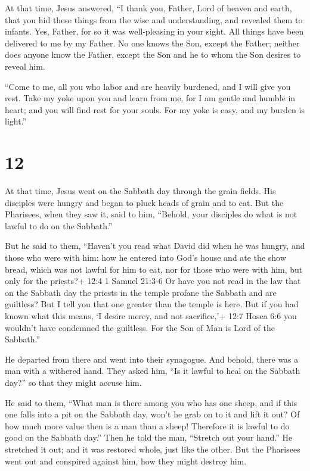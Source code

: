  At that time, Jesus answered, ``I thank you, Father, Lord
of heaven and earth, that you hid these things from the wise and
understanding, and revealed them to infants.  Yes, Father,
for so it was well-pleasing in your sight.  All things have
been delivered to me by my Father. No one knows the Son, except the
Father; neither does anyone know the Father, except the Son and he to
whom the Son desires to reveal him.

 ``Come to me, all you who labor and are heavily burdened,
and I will give you rest.  Take my yoke upon you and learn
from me, for I am gentle and humble in heart; and you will find rest for
your souls.  For my yoke is easy, and my burden is light.''

\hypertarget{section-11}{%
\section{12}\label{section-11}}

 At that time, Jesus went on the Sabbath day through the
grain fields. His disciples were hungry and began to pluck heads of
grain and to eat.  But the Pharisees, when they saw it, said
to him, ``Behold, your disciples do what is not lawful to do on the
Sabbath.''

 But he said to them, ``Haven't you read what David did when
he was hungry, and those who were with him:  how he entered
into God's house and ate the show bread, which was not lawful for him to
eat, nor for those who were with him, but only for the priests?+ 12:4 1
Samuel 21:3-6  Or have you not read in the law that on the
Sabbath day the priests in the temple profane the Sabbath and are
guiltless?  But I tell you that one greater than the temple
is here.  But if you had known what this means, `I desire
mercy, and not sacrifice,'+ 12:7 Hosea 6:6 you wouldn't have condemned
the guiltless.  For the Son of Man is Lord of the Sabbath.''

 He departed from there and went into their synagogue.
 And behold, there was a man with a withered hand. They
asked him, ``Is it lawful to heal on the Sabbath day?'' so that they
might accuse him.

 He said to them, ``What man is there among you who has one
sheep, and if this one falls into a pit on the Sabbath day, won't he
grab on to it and lift it out?  Of how much more value then
is a man than a sheep! Therefore it is lawful to do good on the Sabbath
day.''  Then he told the man, ``Stretch out your hand.'' He
stretched it out; and it was restored whole, just like the other.
 But the Pharisees went out and conspired against him, how
they might destroy him.

